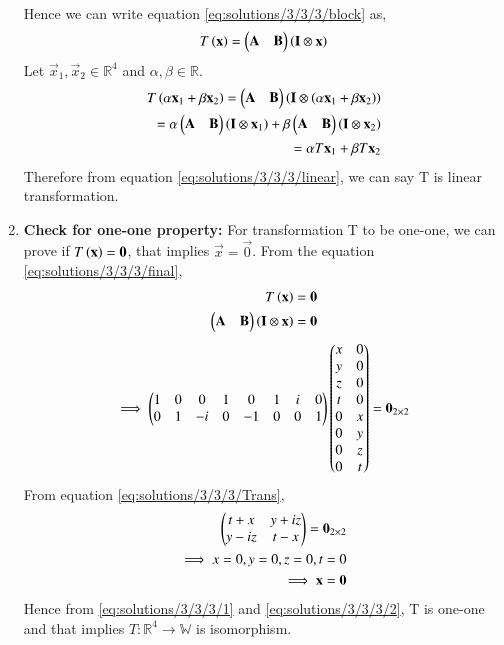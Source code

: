 \begin{enumerate}
\begin{align}
\end{align}
Hence we can write equation \eqref{eq:solutions/3/3/3/block} as,
\begin{align}
 T\left(\mathbf{x}\right)=\begin{pmatrix}\mathbf{A}&\mathbf{B}\end{pmatrix}\left(\mathbf{I}\otimes\mathbf{x}\right) \label{eq:solutions/3/3/3/final}
\end{align}
Let $\vec{x}_1,\vec{x}_2\in\mathbb{R}^4$ and $\alpha,\beta\in\mathbb{R}$.
\begin{align}
T\left(\alpha\mathbf{x}_1+\beta\mathbf{x}_2\right)=\begin{pmatrix}\mathbf{A}&\mathbf{B}\end{pmatrix}\left(\mathbf{I}\otimes\left(\alpha\mathbf{x}_1+\beta\mathbf{x}_2\right)\right)\\
=\alpha\begin{pmatrix}\mathbf{A}&\mathbf{B}\end{pmatrix}\left(\mathbf{I}\otimes\mathbf{x}_1\right)+\beta\begin{pmatrix}\mathbf{A}&\mathbf{B}\end{pmatrix}\left(\mathbf{I}\otimes\mathbf{x}_2\right)\\
=\alpha T\mathbf{x}_1+\beta T\mathbf{x}_2 \label{eq:solutions/3/3/3/linear}
\end{align}
Therefore from equation \eqref{eq:solutions/3/3/3/linear}, we can say T is linear transformation.
\item \textbf{Check for one-one property: }
For transformation T to be one-one, we can prove if $T\left(\mathbf{x}\right)=\mathbf{0}$, that implies $\vec{x}=\vec{0}$. From the equation \eqref{eq:solutions/3/3/3/final},
\begin{align}
T\left(\mathbf{x}\right)=\mathbf{0}\label{eq:solutions/3/3/3/1}\\
\begin{pmatrix}\mathbf{A}&\mathbf{B}\end{pmatrix}\left(\mathbf{I}\otimes\mathbf{x}\right)=\mathbf{0}
\end{align}
\begin{align}
\implies \begin{pmatrix}1&0&0&1&0&1&i&0\\0&1&-i&0&-1&0&0&1\end{pmatrix}\begin{pmatrix}x&0\\y&0\\z&0\\t&0\\0&x\\0&y\\0&z\\0&t\end{pmatrix}=\mathbf{0}_{2\times2}
\end{align}
From equation \eqref{eq:solutions/3/3/3/Trans},
\begin{align}
\begin{pmatrix}t+x&y+iz\\y-iz&t-x\end{pmatrix}=\mathbf{0}_{2\times2}\\
\implies x=0,y=0,z=0,t=0\\
\implies \mathbf{x}=\mathbf{0}\label{eq:solutions/3/3/3/2}
\end{align}
Hence from \eqref{eq:solutions/3/3/3/1} and \eqref{eq:solutions/3/3/3/2}, T is one-one and that implies $T\colon\mathbb{R}^4\to\mathbb{W}$ is isomorphism.
\end{enumerate}
